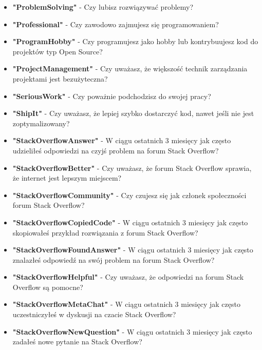 \begin{appendices}
\begin{itemize}
        \item \textbf{"ProblemSolving"} - Czy lubisz rozwiązywać problemy?
        \item \textbf{"Professional"} - Czy zawodowo zajmujesz się programowaniem?
        \item \textbf{"ProgramHobby"} - Czy programujesz jako hobby lub kontrybuujesz kod do projektów typ Open Source?
        \item \textbf{"ProjectManagement"} - Czy uważasz, że większość technik zarządzania projektami jest bezużyteczna?
        \item \textbf{"SeriousWork"} - Czy poważnie podchodzisz do swojej pracy?
        \item \textbf{"ShipIt"} - Czy uważasz, że lepiej szybko dostarczyć kod, nawet jeśli nie jest zoptymalizowany?
        \item \textbf{"StackOverflowAnswer"} - W ciągu ostatnich 3 miesięcy jak często udzieliłeś odpowiedzi na czyjś problem na forum Stack Overflow?
        \item \textbf{"StackOverflowBetter"} - Czy uważasz, że forum Stack Overflow sprawia, że internet jest lepszym miejscem?
        \item \textbf{"StackOverflowCommunity"} - Czy czujesz się jak członek społeczności forum Stack Overflow?
        \item \textbf{"StackOverflowCopiedCode"} - W ciągu ostatnich 3 miesięcy jak często skopiowałeś przykład rozwiązania z forum Stack Overflow?
        \item \textbf{"StackOverflowFoundAnswer"} - W ciągu ostatnich 3 miesięcy jak często znalazłeś odpowiedź na swój problem na forum Stack Overflow?
        \item \textbf{"StackOverflowHelpful"} - Czy uważasz, że odpowiedzi na forum Stack Overflow są pomocne?
        \item \textbf{"StackOverflowMetaChat"} - W ciągu ostatnich 3 miesięcy jak często uczestniczyłeś w dyskusji na czacie Stack Overflow?
        \item \textbf{"StackOverflowNewQuestion"} - W ciągu ostatnich 3 miesięcy jak często zadałeś nowe pytanie na Stack Overflow?

\end{itemize}
\end{appendices}
